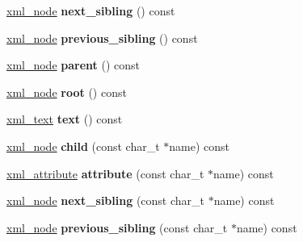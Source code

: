 \begin{DoxyCompactItemize}
\item 
\hypertarget{classpugi_1_1xml__node_a713159ab981fb3f0a325434106dc94f5}{\hyperlink{classpugi_1_1xml__node}{xml\+\_\+node} {\bfseries next\+\_\+sibling} () const }\label{classpugi_1_1xml__node_a713159ab981fb3f0a325434106dc94f5}

\item 
\hypertarget{classpugi_1_1xml__node_a367e7e2c78a3870aad7ad3831da7c0fa}{\hyperlink{classpugi_1_1xml__node}{xml\+\_\+node} {\bfseries previous\+\_\+sibling} () const }\label{classpugi_1_1xml__node_a367e7e2c78a3870aad7ad3831da7c0fa}

\item 
\hypertarget{classpugi_1_1xml__node_a5c7a1b2ec89d59afa1028e9c5fc25640}{\hyperlink{classpugi_1_1xml__node}{xml\+\_\+node} {\bfseries parent} () const }\label{classpugi_1_1xml__node_a5c7a1b2ec89d59afa1028e9c5fc25640}

\item 
\hypertarget{classpugi_1_1xml__node_a713b60fd5cddd5d8671dd76b1457e6eb}{\hyperlink{classpugi_1_1xml__node}{xml\+\_\+node} {\bfseries root} () const }\label{classpugi_1_1xml__node_a713b60fd5cddd5d8671dd76b1457e6eb}

\item 
\hypertarget{classpugi_1_1xml__node_aafe1c1c7cd27f3c9c758b517abc7886a}{\hyperlink{classpugi_1_1xml__text}{xml\+\_\+text} {\bfseries text} () const }\label{classpugi_1_1xml__node_aafe1c1c7cd27f3c9c758b517abc7886a}

\item 
\hypertarget{classpugi_1_1xml__node_af3aa192b114a289640110c9e4da020ca}{\hyperlink{classpugi_1_1xml__node}{xml\+\_\+node} {\bfseries child} (const char\+\_\+t $\ast$name) const }\label{classpugi_1_1xml__node_af3aa192b114a289640110c9e4da020ca}

\item 
\hypertarget{classpugi_1_1xml__node_a19fc1a285c0f751f52c0e151a727de97}{\hyperlink{classpugi_1_1xml__attribute}{xml\+\_\+attribute} {\bfseries attribute} (const char\+\_\+t $\ast$name) const }\label{classpugi_1_1xml__node_a19fc1a285c0f751f52c0e151a727de97}

\item 
\hypertarget{classpugi_1_1xml__node_a51a25d1e6f2315b65a1f969126cbc612}{\hyperlink{classpugi_1_1xml__node}{xml\+\_\+node} {\bfseries next\+\_\+sibling} (const char\+\_\+t $\ast$name) const }\label{classpugi_1_1xml__node_a51a25d1e6f2315b65a1f969126cbc612}

\item 
\hypertarget{classpugi_1_1xml__node_a311405d1ee4a564071a5f44b476b05f7}{\hyperlink{classpugi_1_1xml__node}{xml\+\_\+node} {\bfseries previous\+\_\+sibling} (const char\+\_\+t $\ast$name) const }\label{classpugi_1_1xml__node_a311405d1ee4a564071a5f44b476b05f7}


\end{DoxyCompactItemize}
